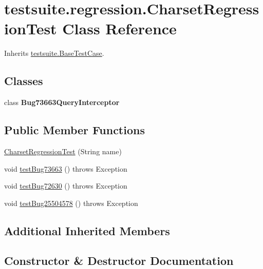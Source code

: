 \hypertarget{classtestsuite_1_1regression_1_1_charset_regression_test}{}\section{testsuite.\+regression.\+Charset\+Regression\+Test Class Reference}
\label{classtestsuite_1_1regression_1_1_charset_regression_test}


Inherits \mbox{\hyperlink{classtestsuite_1_1_base_test_case}{testsuite.\+Base\+Test\+Case}}.

\subsection*{Classes}
\begin{DoxyCompactItemize}
\item 
class {\bfseries Bug73663\+Query\+Interceptor}
\end{DoxyCompactItemize}
\subsection*{Public Member Functions}
\begin{DoxyCompactItemize}
\item 
\mbox{\hyperlink{classtestsuite_1_1regression_1_1_charset_regression_test_ad8877969c709ae03cc43ffd7a0db64fd}{Charset\+Regression\+Test}} (String name)
\item 
void \mbox{\hyperlink{classtestsuite_1_1regression_1_1_charset_regression_test_a46c2702ffcbb3408a1b7fe21ba7b02d5}{test\+Bug73663}} ()  throws Exception 
\item 
void \mbox{\hyperlink{classtestsuite_1_1regression_1_1_charset_regression_test_aea47a9d0535dd2e8b09f2be63c4c5100}{test\+Bug72630}} ()  throws Exception 
\item 
void \mbox{\hyperlink{classtestsuite_1_1regression_1_1_charset_regression_test_a576343bc13a21ec028c8341e914f7e84}{test\+Bug25504578}} ()  throws Exception 
\end{DoxyCompactItemize}
\subsection*{Additional Inherited Members}


\subsection{Constructor \& Destructor Documentation}
\mbox{\label{classtestsuite_1_1regression_1_1_charset_regression_test_ad8877969c709ae03cc43ffd7a0db64fd}} 
